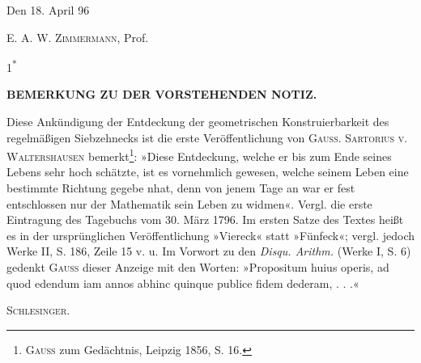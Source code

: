 \noindent Den 18. April 96
\begin{flushright}E. A. W. \textsc{Zimmermann}, Prof.\end{flushright}
\vfill\begin{flushright}\small 1\textsuperscript{*}\end{flushright}
\clearpage
{}
\begin{center}\small\textbf{BEMERKUNG ZU DER VORSTEHENDEN NOTIZ.}\end{center}
\begingroup\small\par\indent
Diese Ankündigung der Entdeckung der geometrischen Konstruierbarkeit des regelmäßigen Siebzehnecks ist die erste Veröffentlichung von \textsc{Gauss}. \textsc{Sartorius v. Waltershausen} bemerkt\footnote{\textsc{Gauss} zum Gedächtnis, Leipzig 1856, S. 16.}: »Diese Entdeckung, welche er bis zum Ende seines Lebens sehr hoch schätzte, ist es vornehmlich gewesen, welche seinem Leben eine bestimmte Richtung gegebe nhat, denn von jenem Tage an war er fest entschlossen nur der Mathematik sein Leben zu widmen«. Vergl. die erste Eintragung des Tagebuchs vom 30. März 1796. Im ersten Satze des Textes heißt es in der ursprünglichen Veröffentlichung »Viereck« statt »Fünfeck«; vergl. jedoch Werke II, S. 186, Zeile 15 v. u. Im Vorwort zu den \textit{Disqu. Arithm.} (Werke I, S. 6) gedenkt \textsc{Gauss} dieser Anzeige mit den Worten: »Propositum huius operis, ad quod edendum iam annos abhinc quinque publice fidem dederam, . . .«
\begin{flushright}\textsc{Schlesinger}.\end{flushright}
\endgroup
\ClosingRule
\clearpage
